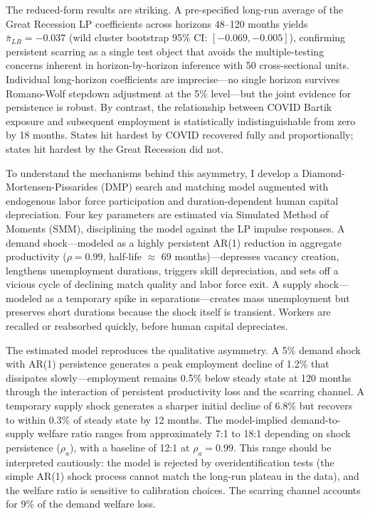 \documentclass[12pt]{article}
\begin{document}
The reduced-form results are striking. A pre-specified long-run average of the Great Recession LP coefficients across horizons 48--120 months yields $\bar{\pi}_{LR} = -0.037$ (wild cluster bootstrap 95\% CI: $[-0.069, -0.005]$), confirming persistent scarring as a single test object that avoids the multiple-testing concerns inherent in horizon-by-horizon inference with 50 cross-sectional units. Individual long-horizon coefficients are imprecise---no single horizon survives Romano-Wolf stepdown adjustment at the 5\% level---but the joint evidence for persistence is robust. By contrast, the relationship between COVID Bartik exposure and subsequent employment is statistically indistinguishable from zero by 18 months. States hit hardest by COVID recovered fully and proportionally; states hit hardest by the Great Recession did not.

To understand the mechanisms behind this asymmetry, I develop a Diamond-Mortensen-Pissarides (DMP) search and matching model augmented with endogenous labor force participation and duration-dependent human capital depreciation. Four key parameters are estimated via Simulated Method of Moments (SMM), disciplining the model against the LP impulse responses. A demand shock---modeled as a highly persistent AR(1) reduction in aggregate productivity ($\rho = 0.99$, half-life $\approx$ 69 months)---depresses vacancy creation, lengthens unemployment durations, triggers skill depreciation, and sets off a vicious cycle of declining match quality and labor force exit. A supply shock---modeled as a temporary spike in separations---creates mass unemployment but preserves short durations because the shock itself is transient. Workers are recalled or reabsorbed quickly, before human capital depreciates.

The estimated model reproduces the qualitative asymmetry. A 5\% demand shock with AR(1) persistence generates a peak employment decline of 1.2\% that dissipates slowly---employment remains 0.5\% below steady state at 120 months through the interaction of persistent productivity loss and the scarring channel. A temporary supply shock generates a sharper initial decline of 6.8\% but recovers to within 0.3\% of steady state by 12 months. The model-implied demand-to-supply welfare ratio ranges from approximately 7:1 to 18:1 depending on shock persistence ($\rho_a$), with a baseline of 12:1 at $\rho_a = 0.99$. This range should be interpreted cautiously: the model is rejected by overidentification tests (the simple AR(1) shock process cannot match the long-run plateau in the data), and the welfare ratio is sensitive to calibration choices. The scarring channel accounts for 9\% of the demand welfare loss.
\end{document}
